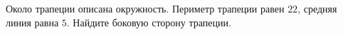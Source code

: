 \begin{ex}
	\begin{condition}
		Около трапеции описана окружность. Периметр трапеции равен \( 22 \), средняя линия равна \( 5 \). Найдите боковую сторону трапеции.
	\end{condition}
\end{ex}